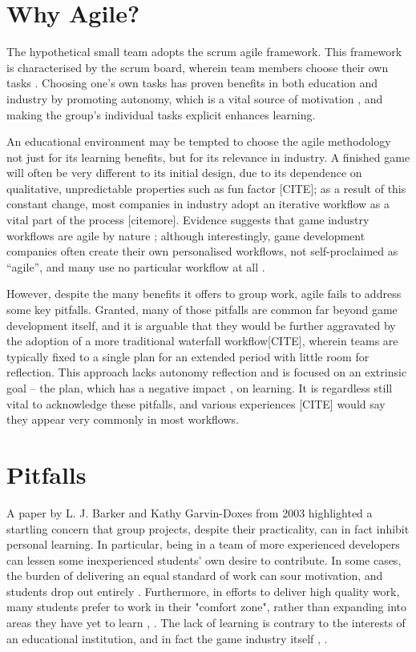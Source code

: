 \documentclass{scrartcl}
\begin{document}
\section{Why Agile?}
The hypothetical small team adopts the scrum agile framework. This framework is characterised by the scrum board, wherein team members choose their own tasks \cite{scrum}. Choosing one's own tasks has proven benefits in both education and industry by promoting autonomy, which is a vital source of motivation \cite{motivation}, and making the group's individual tasks explicit enhances learning. \cite{group2005}

An educational environment may be tempted to choose the agile methodology not just for its learning benefits, but for its relevance in industry. A finished game will often be very different to its initial design, due to its dependence on qualitative, unpredictable properties such as fun factor [CITE]; as a result of this constant change, most companies in industry adopt an iterative workflow as a vital part of the process \cite{iteration} [citemore]. Evidence suggests that game industry workflows are agile by nature \cite{olddays}; although interestingly, game development companies often create their own personalised workflows, not self-proclaimed as ``agile'', and many use no particular workflow at all \cite{devstudy}.

However, despite the many benefits it offers to group work, agile fails to address some key pitfalls. Granted, many of those pitfalls are common far beyond game development itself, and it is arguable that they would be further aggravated by the adoption of a more traditional waterfall workflow[CITE], wherein teams are typically fixed to a single plan for an extended period with little room for reflection. This approach lacks autonomy reflection and is focused on an extrinsic goal -- the plan, which has a negative impact \cite{motivation}, \cite{learningreflection} on learning. It is regardless still vital to acknowledge these pitfalls, and various experiences [CITE] would say they appear very commonly in most workflows.


\section{Pitfalls}
A paper by L. J. Barker and Kathy Garvin-Doxes from 2003 highlighted a startling concern that group projects, despite their practicality, can in fact inhibit personal learning. In particular, being in a team of more experienced developers can lessen some inexperienced students' own desire to contribute. In some cases, the burden of delivering an equal standard of work can sour motivation, and students drop out entirely \cite{group2003}. Furthermore, in efforts to deliver high quality work, many students prefer to work in their "comfort zone", rather than expanding into areas they have yet to learn \cite{group2003}, \cite{group2005}. The lack of learning is contrary to the interests of an educational institution, and in fact the game industry itself \cite{collaboration}, \cite{devstudy}.
\end{document}
